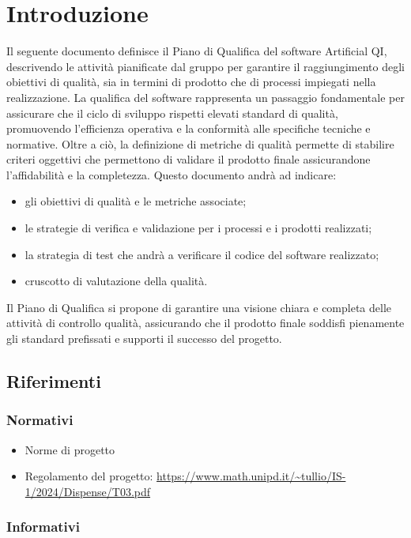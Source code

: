 \section{Introduzione}
\label{sec:introduzione_pq}
Il seguente documento definisce il Piano di Qualifica del software Artificial QI, descrivendo le attività  pianificate dal gruppo
per garantire il raggiungimento degli obiettivi di qualità, sia in termini di prodotto che di processi impiegati nella realizzazione.
La qualifica del software rappresenta un passaggio fondamentale per assicurare che il ciclo di sviluppo rispetti elevati standard di qualità, 
promuovendo l'efficienza operativa e la conformità alle specifiche tecniche e normative.
Oltre a ciò, la definizione di metriche di qualità permette di stabilire criteri oggettivi che permettono di validare il prodotto finale 
assicurandone l'affidabilità e la completezza.
Questo documento andrà ad indicare:
\begin{itemize}
    \item gli obiettivi di qualità e le metriche associate;
    \item le strategie di verifica e validazione per i processi e i prodotti realizzati;
    \item la strategia di test che andrà a verificare il codice del software realizzato;
    \item cruscotto di valutazione della qualità.
\end{itemize}
Il Piano di Qualifica si propone di garantire una visione chiara e completa delle attività di controllo qualità, 
assicurando che il prodotto finale soddisfi pienamente gli standard prefissati e supporti il successo del progetto.
\subsection{Riferimenti}
\subsubsection{Normativi}
\begin{itemize}
    \item Norme di progetto
    \item Regolamento del progetto: \url{https://www.math.unipd.it/~tullio/IS-1/2024/Dispense/T03.pdf}
\end{itemize}
\subsubsection{Informativi}


